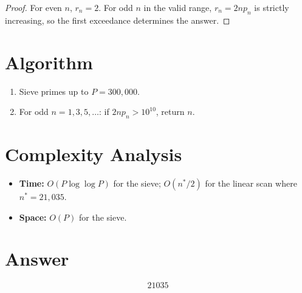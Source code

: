\documentclass[11pt,a4paper]{article}
\begin{document}
\begin{proof}
For even $n$, $r_n = 2$. For odd $n$ in the valid range, $r_n = 2np_n$ is strictly increasing, so the first exceedance determines the answer.
\end{proof}

\section{Algorithm}

\begin{enumerate}
\item Sieve primes up to $P = 300{,}000$.
\item For odd $n = 1, 3, 5, \ldots$: if $2np_n > 10^{10}$, return $n$.
\end{enumerate}

\section{Complexity Analysis}

\begin{itemize}
\item \textbf{Time:} $O(P \log \log P)$ for the sieve; $O(n^*/2)$ for the linear scan where $n^* = 21{,}035$.
\item \textbf{Space:} $O(P)$ for the sieve.
\end{itemize}

\section{Answer}

\[
\boxed{21035}
\]
\end{document}
